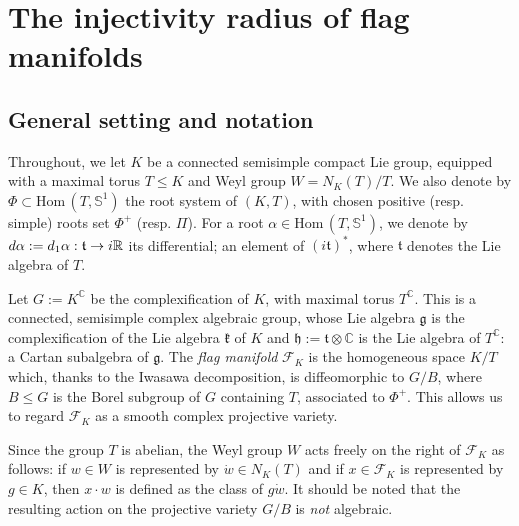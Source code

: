 \documentclass[11pt,twoside]{amsart}
\theoremstyle{plain}
\newcommand{\C}{{\mathbb C}}
\newcommand{\R}{{\mathbb R}}
\newcommand{\ho}{\mathrm{Hom}\,}
\newcommand{\Sph}{\mathbb{S}}
\begin{document}
\section{The injectivity radius of flag manifolds}



\subsection{General setting and notation}\label{setting}
Throughout, we let $K$ be a connected semisimple compact Lie group, equipped with a maximal torus $T\le K$ and Weyl group $W=N_K(T)/T$. We also denote by $\Phi\subset\ho(T,\Sph^1)$ the root system of $(K,T)$, with chosen positive (resp. simple) roots set $\Phi^+$ (resp. $\Pi$). For a root $\alpha\in\ho(T,\Sph^1)$, we denote by ${\rm d}\alpha:={\rm d}_1\alpha : \mathfrak{t}\to i\R$ its differential; an element of $(i\mathfrak{t})^*$, where $\mathfrak{t}$ denotes the Lie algebra of $T$.%

Let $G:=K^\C$ be the complexification of $K$, with maximal torus $T^\C$. This is a connected, semisimple complex algebraic group, whose Lie algebra $\mathfrak{g}$ is the complexification of the Lie algebra $\mathfrak{k}$ of $K$ and $\mathfrak{h}:=\mathfrak{t}\otimes\C$ is the Lie algebra of $T^\C$: a Cartan subalgebra of $\mathfrak{g}$. The \textit{flag manifold} $\mathcal{F}_K$ is the homogeneous space $K/T$ which, thanks to the Iwasawa decomposition, is diffeomorphic to $G/B$, where $B\le G$ is the Borel subgroup of $G$ containing $T$, associated to $\Phi^+$. This allows us to regard $\mathcal{F}_K$ as a smooth complex projective variety.

Since the group $T$ is abelian, the Weyl group $W$ acts freely on the right of $\mathcal{F}_K$ as follows: if $w\in W$ is represented by $\dot{w}\in N_K(T)$ and if $x\in\mathcal{F}_K$ is represented by $g\in K$, then $x\cdot w$ is defined as the class of $g\dot{w}$. It should be noted that the resulting action on the projective variety $G/B$ is \textit{not} algebraic.
\end{document}
